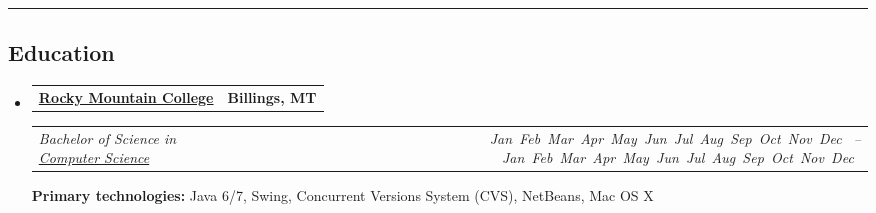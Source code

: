 \documentclass[9pt,letterpaper]{extarticle}
\makeatletter
\newcommand{\headerrow}[2]
{\begin{tabular*}{\linewidth}{l@{\extracolsep{\fill}}r}
	#1 &
	#2 \\
\end{tabular*}}
\newcommand{\DatestampYM}[2]{\mbox{\ShortMonth{#2} #1}}
\newcommand{\ShortMonth}[1]{%
\ifcase#1\relax
\or Jan%
\or Feb%
\or Mar%
\or Apr%
\or May%
\or Jun%
\or Jul%
\or Aug%
\or Sep%
\or Oct%
\or Nov%
\or Dec%
\fi}
\makeatother
\begin{document}
\hrule
\vspace{-0.2em}
\subsection*{Education}

\begin{itemize}
	\parskip=0.1em

	\item
	\headerrow
		{\textbf{\href{http://www.rocky.edu/}{Rocky Mountain College}}}
		{\textbf{Billings, MT}}
	\headerrow
		{\emph{Bachelor of Science in \href{http://cs.rocky.edu/}{Computer Science}}}
		{\emph{\DatestampYM{2010}{08} -- \DatestampYM{2014}{05}}}
	\textbf{Primary technologies:} Java 6/7, Swing, Concurrent Versions System (CVS), NetBeans, Mac OS X
\end{itemize}
\end{document}

